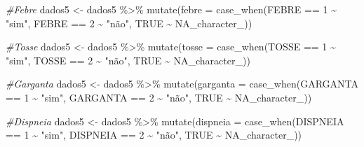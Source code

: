 \documentclass[
]{article}
\newenvironment{Shaded}{\begin{snugshade}}{\end{snugshade}}
\newcommand{\AttributeTok}[1]{\textcolor[rgb]{0.77,0.63,0.00}{#1}}
\newcommand{\CommentTok}[1]{\textcolor[rgb]{0.56,0.35,0.01}{\textit{#1}}}
\newcommand{\ConstantTok}[1]{\textcolor[rgb]{0.00,0.00,0.00}{#1}}
\newcommand{\DecValTok}[1]{\textcolor[rgb]{0.00,0.00,0.81}{#1}}
\newcommand{\FunctionTok}[1]{\textcolor[rgb]{0.00,0.00,0.00}{#1}}
\newcommand{\NormalTok}[1]{#1}
\newcommand{\OtherTok}[1]{\textcolor[rgb]{0.56,0.35,0.01}{#1}}
\newcommand{\SpecialCharTok}[1]{\textcolor[rgb]{0.00,0.00,0.00}{#1}}
\newcommand{\StringTok}[1]{\textcolor[rgb]{0.31,0.60,0.02}{#1}}
\begin{document}
\begin{Shaded}
\begin{Highlighting}[]
\CommentTok{\#Febre}
\NormalTok{dados5 }\OtherTok{\textless{}{-}}\NormalTok{  dados5 }\SpecialCharTok{\%\textgreater{}\%}
  \FunctionTok{mutate}\NormalTok{(}\AttributeTok{febre =} \FunctionTok{case\_when}\NormalTok{(FEBRE }\SpecialCharTok{==} \DecValTok{1} \SpecialCharTok{\textasciitilde{}} \StringTok{"sim"}\NormalTok{,}
\NormalTok{                           FEBRE }\SpecialCharTok{==} \DecValTok{2} \SpecialCharTok{\textasciitilde{}} \StringTok{"não"}\NormalTok{,}
                           \ConstantTok{TRUE} \SpecialCharTok{\textasciitilde{}} \ConstantTok{NA\_character\_}\NormalTok{))}

\CommentTok{\#Tosse}
\NormalTok{dados5 }\OtherTok{\textless{}{-}}\NormalTok{  dados5 }\SpecialCharTok{\%\textgreater{}\%}
  \FunctionTok{mutate}\NormalTok{(}\AttributeTok{tosse =} \FunctionTok{case\_when}\NormalTok{(TOSSE }\SpecialCharTok{==} \DecValTok{1} \SpecialCharTok{\textasciitilde{}} \StringTok{"sim"}\NormalTok{,}
\NormalTok{                           TOSSE }\SpecialCharTok{==} \DecValTok{2} \SpecialCharTok{\textasciitilde{}} \StringTok{"não"}\NormalTok{,}
                           \ConstantTok{TRUE} \SpecialCharTok{\textasciitilde{}} \ConstantTok{NA\_character\_}\NormalTok{))}

\CommentTok{\#Garganta}
\NormalTok{dados5 }\OtherTok{\textless{}{-}}\NormalTok{  dados5 }\SpecialCharTok{\%\textgreater{}\%}
  \FunctionTok{mutate}\NormalTok{(}\AttributeTok{garganta =} \FunctionTok{case\_when}\NormalTok{(GARGANTA }\SpecialCharTok{==} \DecValTok{1} \SpecialCharTok{\textasciitilde{}} \StringTok{"sim"}\NormalTok{,}
\NormalTok{                              GARGANTA }\SpecialCharTok{==} \DecValTok{2} \SpecialCharTok{\textasciitilde{}} \StringTok{"não"}\NormalTok{,}
                              \ConstantTok{TRUE} \SpecialCharTok{\textasciitilde{}} \ConstantTok{NA\_character\_}\NormalTok{))}

\CommentTok{\#Dispneia}
\NormalTok{dados5 }\OtherTok{\textless{}{-}}\NormalTok{  dados5 }\SpecialCharTok{\%\textgreater{}\%}
  \FunctionTok{mutate}\NormalTok{(}\AttributeTok{dispneia =} \FunctionTok{case\_when}\NormalTok{(DISPNEIA }\SpecialCharTok{==} \DecValTok{1} \SpecialCharTok{\textasciitilde{}} \StringTok{"sim"}\NormalTok{,}
\NormalTok{                              DISPNEIA }\SpecialCharTok{==} \DecValTok{2} \SpecialCharTok{\textasciitilde{}} \StringTok{"não"}\NormalTok{,}
                              \ConstantTok{TRUE} \SpecialCharTok{\textasciitilde{}} \ConstantTok{NA\_character\_}\NormalTok{))}


\end{Highlighting}
\end{Shaded}
\end{document}
